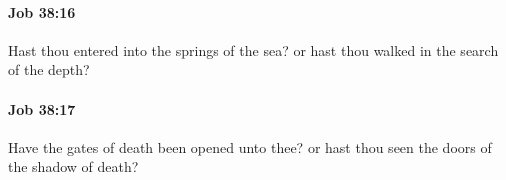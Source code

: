 		\paragraph{Job 38:16} %
			\label{JOB-38-16}

			Hast thou entered into the springs of the sea? or hast thou walked in the search of the depth?


		\paragraph{Job 38:17} %
			\label{JOB-38-17}

			Have the gates of death been opened unto thee? or hast thou seen the doors of the shadow of death?


